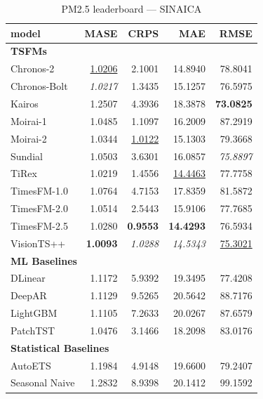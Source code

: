\begin{table}[H]
\caption{PM2.5 leaderboard --- SINAICA}
\centering
\begin{small}
\begin{tabular}{lrrrr}
\toprule
model & MASE & CRPS & MAE & RMSE \\
\midrule
\multicolumn{5}{l}{\textbf{TSFMs}} \\
Chronos-2 & \underline{1.0206} & 2.1001 & 14.8940 & 78.8041 \\
Chronos-Bolt & \textit{1.0217} & 1.3435 & 15.1257 & 76.5975 \\
Kairos & 1.2507 & 4.3936 & 18.3878 & \textbf{73.0825} \\
Moirai-1 & 1.0485 & 1.1097 & 16.2009 & 87.2919 \\
Moirai-2 & 1.0344 & \underline{1.0122} & 15.1303 & 79.3668 \\
Sundial & 1.0503 & 3.6301 & 16.0857 & \textit{75.8897} \\
TiRex & 1.0219 & 1.4556 & \underline{14.4463} & 77.7758 \\
TimesFM-1.0 & 1.0764 & 4.7153 & 17.8359 & 81.5872 \\
TimesFM-2.0 & 1.0514 & 2.5443 & 15.9106 & 77.7685 \\
TimesFM-2.5 & 1.0280 & \textbf{0.9553} & \textbf{14.4293} & 76.5934 \\
VisionTS++ & \textbf{1.0093} & \textit{1.0288} & \textit{14.5343} & \underline{75.3021} \\
\midrule
\multicolumn{5}{l}{\textbf{ML Baselines}} \\
DLinear & 1.1172 & 5.9392 & 19.3495 & 77.4208 \\
DeepAR & 1.1129 & 9.5265 & 20.5642 & 88.7176 \\
LightGBM & 1.1105 & 7.2633 & 20.0267 & 87.6579 \\
PatchTST & 1.0476 & 3.1466 & 18.2098 & 83.0176 \\
\midrule
\multicolumn{5}{l}{\textbf{Statistical Baselines}} \\
AutoETS & 1.1984 & 4.9148 & 19.6600 & 79.2407 \\
Seasonal Naive & 1.2832 & 8.9398 & 20.1412 & 99.1592 \\
\bottomrule
\end{tabular}
\end{small}
\end{table}